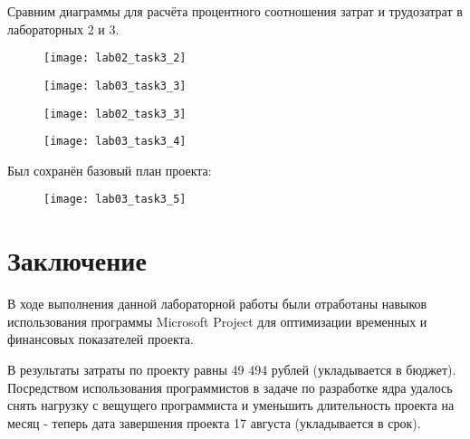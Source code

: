 Сравним диаграммы для расчёта процентного соотношения затрат и трудозатрат в лабораторных 2 и 3.
\clearpage

\begin{figure}[h!]
	\texttt{[image: lab02\_task3\_2]}
\end{figure}

\begin{figure}[h!]
	\texttt{[image: lab03\_task3\_3]}
\end{figure}

\clearpage

\begin{figure}[h!]
	\texttt{[image: lab02\_task3\_3]}
\end{figure}


\begin{figure}[h!]
	\texttt{[image: lab03\_task3\_4]}
\end{figure}

Был сохранён базовый план проекта:

\begin{figure}[h!]
	\texttt{[image: lab03\_task3\_5]}
\end{figure}

\section*{Заключение}

В ходе выполнения данной лабораторной работы были отработаны навыков использования программы Microsoft Project для оптимизации временных и финансовых показателей проекта.

В результаты затраты по проекту равны 49 494 рублей (укладывается в бюджет).
Посредством использования программистов в задаче по разработке ядра удалось снять нагрузку с вещущего программиста и уменьшить длительность проекта на месяц - теперь дата завершения проекта 17 августа (укладывается в срок).